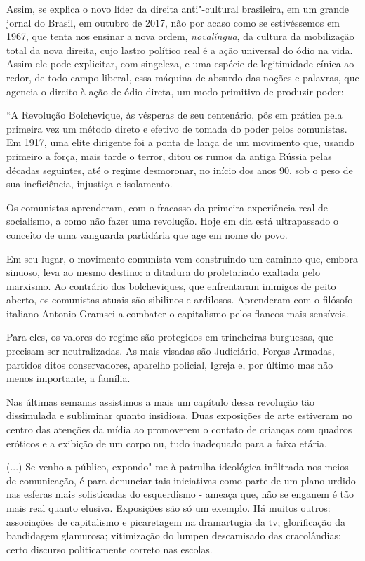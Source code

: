 Assim, se explica o novo líder da direita anti"-cultural brasileira, em
um grande jornal do Brasil, em outubro de 2017, não por acaso como se
estivéssemos em 1967, que tenta nos ensinar a nova ordem,
\emph{novalíngua}, da cultura da mobilização total da nova direita, cujo
lastro político real é a ação universal do ódio na vida. Assim ele pode
explicitar, com singeleza, e uma espécie de legitimidade cínica ao
redor, de todo campo liberal, essa máquina de absurdo das noções e
palavras, que agencia o direito à ação de ódio direta, um modo primitivo
de produzir poder:

``A Revolução Bolchevique, às vésperas de seu centenário, pôs em prática
pela primeira vez um método direto e efetivo de tomada do poder pelos
comunistas. Em 1917, uma elite dirigente foi a ponta de lança de um
movimento que, usando primeiro a força, mais tarde o terror, ditou os
rumos da antiga Rússia pelas décadas seguintes, até o regime desmoronar,
no início dos anos 90, sob o peso de sua ineficiência, injustiça e
isolamento.

Os comunistas aprenderam, com o fracasso da primeira experiência real de
socialismo, a como não fazer uma revolução. Hoje em dia está
ultrapassado o conceito de uma vanguarda partidária que age em nome do
povo.

Em seu lugar, o movimento comunista vem construindo um caminho que,
embora sinuoso, leva ao mesmo destino: a ditadura do proletariado
exaltada pelo marxismo. Ao contrário dos bolcheviques, que enfrentaram
inimigos de peito aberto, os comunistas atuais são sibilinos e
ardilosos. Aprenderam com o filósofo italiano Antonio Gramsci a combater
o capitalismo pelos flancos mais sensíveis.

Para eles, os valores do regime são protegidos em trincheiras burguesas,
que precisam ser neutralizadas. As mais visadas são Judiciário, Forças
Armadas, partidos ditos conservadores, aparelho policial, Igreja e, por
último mas não menos importante, a família.

Nas últimas semanas assistimos a mais um capítulo dessa revolução tão
dissimulada e subliminar quanto insidiosa. Duas exposições de arte
estiveram no centro das atenções da mídia ao promoverem o contato de
crianças com quadros eróticos e a exibição de um corpo nu, tudo
inadequado para a faixa etária.

(...) Se venho a público, expondo"-me à patrulha ideológica infiltrada
nos meios de comunicação, é para denunciar tais iniciativas como parte
de um plano urdido nas esferas mais sofisticadas do esquerdismo - ameaça
que, não se enganem é tão mais real quanto elusiva. Exposições são só um
exemplo. Há muitos outros: associações de capitalismo e picaretagem na
dramartugia da tv; glorificação da bandidagem glamurosa; vitimização do
lumpen descamisado das cracolândias; certo discurso politicamente
correto nas escolas.

